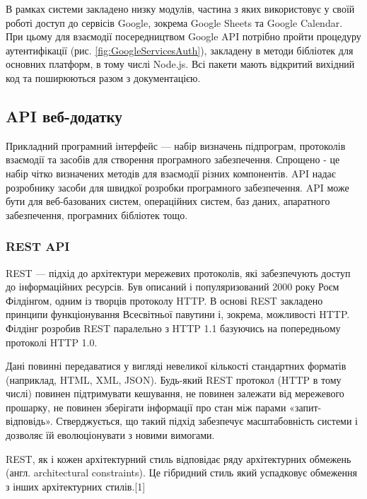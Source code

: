 В рамках системи закладено низку модулів, частина з яких використовує у своїй роботі доступ до сервісів Google, зокрема Google Sheets та Google Calendar. При цьому для взаємодії посередництвом Google API потрібно пройти процедуру аутентифікації (рис. \ref{fig:GoogleServicesAuth}), закладену в методи бібліотек для основних платформ, в тому числі Node.js. Всі пакети мають відкритий вихідний код та поширюються разом з документацією.



\subsection{API веб-додатку}

Прикладний програмний інтерфейс — набір визначень підпрограм, протоколів взаємодії та засобів для створення програмного забезпечення. Спрощено - це набір чітко визначених методів для взаємодії різних компонентів. API надає розробнику засоби для швидкої розробки програмного забезпечення. API може бути для веб-базованих систем, операційних систем, баз даних, апаратного забезпечення, програмних бібліотек тощо.

\subsubsection{REST API}

REST — підхід до архітектури мережевих протоколів, які забезпечують доступ до інформаційних ресурсів. Був описаний і популяризований 2000 року Роєм Філдінгом, одним із творців протоколу HTTP. В основі REST закладено принципи функціонування Всесвітньої павутини і, зокрема, можливості HTTP. Філдінг розробив REST паралельно з HTTP 1.1 базуючись на попередньому протоколі HTTP 1.0.

Дані повинні передаватися у вигляді невеликої кількості стандартних форматів (наприклад, HTML, XML, JSON). Будь-який REST протокол (HTTP в тому числі) повинен підтримувати кешування, не повинен залежати від мережевого прошарку, не повинен зберігати інформації про стан між парами «запит-відповідь». Стверджується, що такий підхід забезпечує масштабовність системи і дозволяє їй еволюціонувати з новими вимогами.

REST, як і кожен архітектурний стиль відповідає ряду архітектурних обмежень (англ. architectural constraints). Це гібридний стиль який успадковує обмеження з інших архітектурних стилів.[1]

